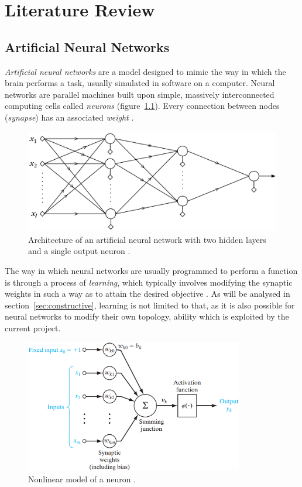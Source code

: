 \documentclass[11pt,a4paper]{report}
\begin{document}
	
	\chapter{Literature Review}
		\section{Artificial Neural Networks}
			\emph{Artificial neural networks} are a model designed to mimic the way in which the brain performs a task, usually simulated in software on a computer. Neural networks are parallel machines built upon simple, massively interconnected computing cells called \emph{neurons} (figure~\ref{fig:multilayer}). Every connection between nodes (\emph{synapse}) has an associated \emph{weight} \cite{haykin2009neural}.
		
			\begin{figure}[h]
				\centering
				\includegraphics[width=\textwidth]{multilayer}
				\caption{Architecture of an artificial neural network with two hidden layers and a single output neuron \cite{theodoridis2008pattern}.}
				\label{fig:multilayer}
			\end{figure}		
		
			The way in which neural networks are usually programmed to perform a function is through a process of \emph{learning}, which typically involves modifying the synaptic weights in such a way as to attain the desired objective \cite{haykin2009neural}. As will be analysed in section~\ref{sec:constructive}, learning is not limited to that, as it is also possible for neural networks to modify their own topology, ability which is exploited by the current project.
		
			\newpage
		
			\begin{figure}[t]
				\centering
				\includegraphics[width=0.85\textwidth]{neuron}
				\caption{Nonlinear model of a neuron \cite{haykin2009neural}.}
				\label{fig:neuron}
			\end{figure}
		
\end{document}
